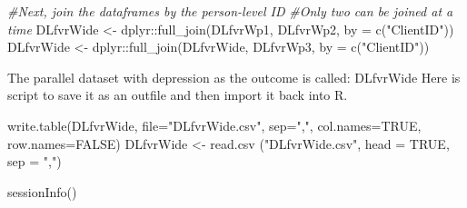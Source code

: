 \documentclass[
  11pt,
]{book}
\newenvironment{Shaded}{\begin{snugshade}}{\end{snugshade}}
\newcommand{\AttributeTok}[1]{\textcolor[rgb]{0.77,0.63,0.00}{#1}}
\newcommand{\CommentTok}[1]{\textcolor[rgb]{0.56,0.35,0.01}{\textit{#1}}}
\newcommand{\ConstantTok}[1]{\textcolor[rgb]{0.00,0.00,0.00}{#1}}
\newcommand{\FunctionTok}[1]{\textcolor[rgb]{0.00,0.00,0.00}{#1}}
\newcommand{\NormalTok}[1]{#1}
\newcommand{\OtherTok}[1]{\textcolor[rgb]{0.56,0.35,0.01}{#1}}
\newcommand{\SpecialCharTok}[1]{\textcolor[rgb]{0.00,0.00,0.00}{#1}}
\newcommand{\StringTok}[1]{\textcolor[rgb]{0.31,0.60,0.02}{#1}}
\begin{document}
\begin{Shaded}
\begin{Highlighting}[]
\CommentTok{\#Next, join the dataframes by the person{-}level ID}
\CommentTok{\#Only two can be joined at a time}
\NormalTok{DLfvrWide }\OtherTok{\textless{}{-}}\NormalTok{ dplyr}\SpecialCharTok{::}\FunctionTok{full\_join}\NormalTok{(DLfvrWp1, DLfvrWp2, }\AttributeTok{by =} \FunctionTok{c}\NormalTok{(}\StringTok{"ClientID"}\NormalTok{))}
\NormalTok{DLfvrWide }\OtherTok{\textless{}{-}}\NormalTok{ dplyr}\SpecialCharTok{::}\FunctionTok{full\_join}\NormalTok{(DLfvrWide, DLfvrWp3,  }\AttributeTok{by =} \FunctionTok{c}\NormalTok{(}\StringTok{"ClientID"}\NormalTok{))}
\end{Highlighting}
\end{Shaded}

The parallel dataset with depression as the outcome is called: DLfvrWide Here is script to save it as an outfile and then import it back into R.

\begin{Shaded}
\begin{Highlighting}[]
\FunctionTok{write.table}\NormalTok{(DLfvrWide, }\AttributeTok{file=}\StringTok{"DLfvrWide.csv"}\NormalTok{, }\AttributeTok{sep=}\StringTok{","}\NormalTok{, }\AttributeTok{col.names=}\ConstantTok{TRUE}\NormalTok{, }\AttributeTok{row.names=}\ConstantTok{FALSE}\NormalTok{)}
\NormalTok{DLfvrWide }\OtherTok{\textless{}{-}} \FunctionTok{read.csv}\NormalTok{ (}\StringTok{"DLfvrWide.csv"}\NormalTok{, }\AttributeTok{head =} \ConstantTok{TRUE}\NormalTok{, }\AttributeTok{sep =} \StringTok{","}\NormalTok{)}
\end{Highlighting}
\end{Shaded}

\begin{Shaded}
\begin{Highlighting}[]
\FunctionTok{sessionInfo}\NormalTok{()}
\end{Highlighting}
\end{Shaded}
\end{document}
